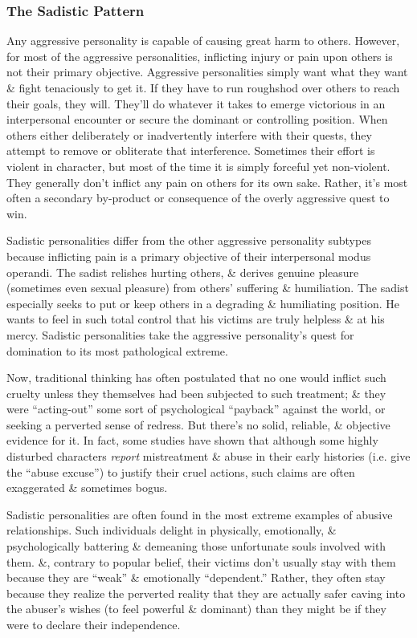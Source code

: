 \documentclass{article}
\numberwithin{equation}{section}
\begin{document}
\subsubsection{The Sadistic Pattern}
Any aggressive personality is capable of causing great harm to others. However, for most of the aggressive personalities, inflicting injury or pain upon others is not their primary objective. Aggressive personalities simply want what they want \& fight tenaciously to get it. If they have to run roughshod over others to reach their goals, they will. They'll do whatever it takes to emerge victorious in an interpersonal encounter or secure the dominant or controlling position. When others either deliberately or inadvertently interfere with their quests, they attempt to remove or obliterate that interference. Sometimes their effort is violent in character, but most of the time it is simply forceful yet non-violent. They generally don't inflict any pain on others for its own sake. Rather, it's most often a secondary by-product or consequence of the overly aggressive quest to win.

Sadistic personalities differ from the other aggressive personality subtypes because inflicting pain is a primary objective of their interpersonal modus operandi. The sadist relishes hurting others, \& derives genuine pleasure (sometimes even sexual pleasure) from others' suffering \& humiliation. The sadist especially seeks to put or keep others in a degrading \& humiliating position. He wants to feel in such total control that his victims are truly helpless \& at his mercy. Sadistic personalities take the aggressive personality's quest for domination to its most pathological extreme.

Now, traditional thinking has often postulated that no one would inflict such cruelty unless they themselves had been subjected to such treatment; \& they were ``acting-out'' some sort of psychological ``payback'' against the world, or seeking a perverted sense of redress. But there's no solid, reliable, \& objective evidence for it. In fact, some studies have shown that although some highly disturbed characters \textit{report} mistreatment \& abuse in their early histories (i.e. give the ``abuse excuse'') to justify their cruel actions, such claims are often exaggerated \& sometimes bogus.

Sadistic personalities are often found in the most extreme examples of abusive relationships. Such individuals delight in physically, emotionally, \& psychologically battering \& demeaning those unfortunate souls involved with them. \&, contrary to popular belief, their victims don't usually stay with them because they are ``weak'' \& emotionally ``dependent.'' Rather, they often stay because they realize the perverted reality that they are actually safer caving into the abuser's wishes (to feel powerful \& dominant) than they might be if they were to declare their independence.
\end{document}
